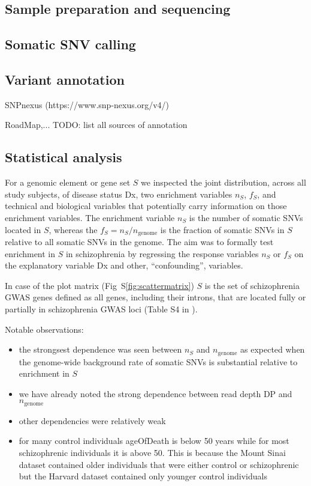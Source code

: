 \documentclass[letterpaper]{article}
\begin{document}
\subsection*{Sample preparation and sequencing}

\subsection*{Somatic SNV calling}

\subsection*{Variant annotation}

SNPnexus (https://www.snp-nexus.org/v4/)

RoadMap,... TODO: list all sources of annotation

\subsection*{Statistical analysis}

For a genomic element or gene set  \(S\) we inspected the joint distribution,
across all study subjects, of disease status Dx, two enrichment variables
\(n_S\), \(f_S\), and technical and biological variables that potentially
carry information on those enrichment variables.  The enrichment variable
\(n_S\) is the number of somatic SNVs located in \(S\), whereas the \(f_S =
	n_S/n_\mathrm{genome}\) is the fraction of somatic SNVs in \(S\)
relative to all somatic SNVs in the genome.  The aim was to formally test
enrichment in \(S\) in schizophrenia by regressing the response variables
\(n_S\) or \(f_S\) on the explanatory variable Dx
and other, ``confounding'', variables.

In case of the plot matrix (Fig~S\ref{fig:scattermatrix}) \(S\) is the set of schizophrenia GWAS genes
defined as all genes, including their introns, that are located fully or
partially in schizophrenia GWAS loci (Table S4 in \cite{Pardinas2018}).

Notable observations:
\begin{itemize}
	\item the strongsest dependence was seen between \(n_S\) and \(n_\mathrm{genome}\) as expected
		when the genome-wide background rate of somatic SNVs is
		substantial relative to enrichment in \(S\)
	\item we have already noted the strong dependence between read depth DP and
		\(n_\mathrm{genome}\)
        \item other dependencies were relatively weak
	\item for many control individuals ageOfDeath is below 50 years while for
		most schizophrenic individuals it is above 50.  This is
		because the Mount Sinai dataset contained older individuals
		that were either control or schizophrenic but the Harvard dataset contained
		only younger control individuals
\end{itemize}
\end{document}
